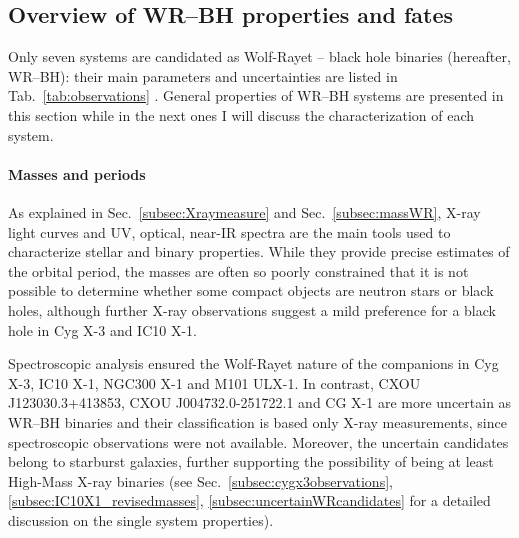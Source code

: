 \documentclass[a4paper,titlepage]{book}     	%
\begin{document}
\subsection{Overview of WR--BH properties and fates}
Only seven systems are candidated as Wolf-Rayet -- black hole binaries (hereafter, WR--BH): their main parameters and uncertainties are listed in Tab.\ \ref{tab:observations} \cite{observations}. General properties of WR--BH systems are presented in this section while in the next ones I will discuss the characterization of each system.


\paragraph{Masses and periods} As explained in Sec.\ \ref{subsec:Xraymeasure} and Sec.\ \ref{subsec:massWR}, X-ray light curves and UV, optical, near-IR spectra are the main tools used to characterize stellar and binary properties. While they provide precise estimates of the orbital period, the masses are often so poorly constrained that it is not possible to determine whether some compact objects are neutron stars or black holes, although further X-ray observations suggest a mild preference for a black hole in Cyg X-3 and IC10 X-1. 

Spectroscopic analysis ensured the Wolf-Rayet nature of the companions in Cyg X-3, IC10 X-1, NGC300 X-1 and M101 ULX-1. In contrast, CXOU J123030.3+413853, CXOU J004732.0-251722.1 and CG X-1 are more uncertain as WR--BH binaries and their classification is based only X-ray measurements, since spectroscopic observations were not available.  Moreover, the uncertain candidates belong to starburst galaxies, further supporting the possibility of being at least High-Mass X-ray binaries (see Sec.\ \ref{subsec:cygx3observations}, \ref{subsec:IC10X1_revisedmasses}, \ref{subsec:uncertainWRcandidates} for a detailed discussion on the single system properties).
\end{document}
